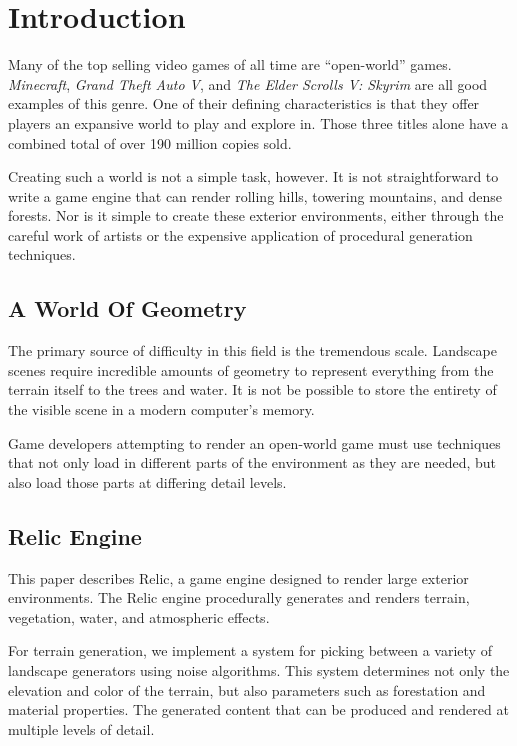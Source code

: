 
\chapter{Introduction}

Many of the top selling video games of all time are ``open-world'' games.
{\em Minecraft}, {\em Grand Theft Auto V}, and {\em The Elder Scrolls V: Skyrim} are all good examples of this genre.
One of their defining characteristics is that they offer players an expansive world to play and explore in.
Those three titles alone have a combined total of over 190 million copies sold.

Creating such a world is not a simple task, however.
It is not straightforward to write a game engine that can render rolling hills, towering mountains, and dense forests.
Nor is it simple to create these exterior environments, either through the careful work of artists or the expensive application of procedural generation techniques.


\section{A World Of Geometry}

The primary source of difficulty in this field is the tremendous scale.
Landscape scenes require incredible amounts of geometry to represent everything from the terrain itself to the trees and water.
It is not be possible to store the entirety of the visible scene in a modern computer's memory.

Game developers attempting to render an open-world game must use techniques that not only load in different parts of the environment as they are needed, but also load those parts at differing detail levels.


\section{Relic Engine}

This paper describes Relic, a game engine designed to render large exterior environments.
The Relic engine procedurally generates and renders terrain, vegetation, water, and atmospheric effects.

For terrain generation, we implement a system for picking between a variety of landscape generators using noise algorithms.
This system determines not only the elevation and color of the terrain, but also parameters such as forestation and material properties.
The generated content that can be produced and rendered at multiple levels of detail.

